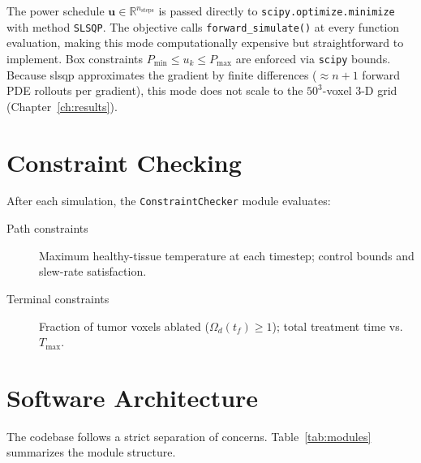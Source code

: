 The power schedule $\mathbf{u} \in \mathbb{R}^{n_{\text{steps}}}$ is passed
directly to \texttt{scipy.optimize.minimize} with method \texttt{SLSQP}.
The objective calls \texttt{forward\_simulate()} at every function evaluation,
making this mode computationally expensive but straightforward to implement.
Box constraints $P_{\min} \leq u_k \leq P_{\max}$ are enforced via
\texttt{scipy} bounds.
Because \gls{slsqp} approximates the gradient by finite differences
($\approx n+1$ forward PDE rollouts per gradient), this mode does not
scale to the $50^3$-voxel 3-D grid (Chapter~\ref{ch:results}).

\section{Constraint Checking}

After each simulation, the \texttt{ConstraintChecker} module evaluates:
\begin{description}
    \item[Path constraints] Maximum healthy-tissue temperature at each timestep;
        control bounds and slew-rate satisfaction.
    \item[Terminal constraints] Fraction of tumor voxels ablated
        ($\Omega_d(t_f) \geq 1$); total treatment time vs.\ $T_{\max}$.
\end{description}

\section{Software Architecture}

The codebase follows a strict separation of concerns.
Table~\ref{tab:modules} summarizes the module structure.

